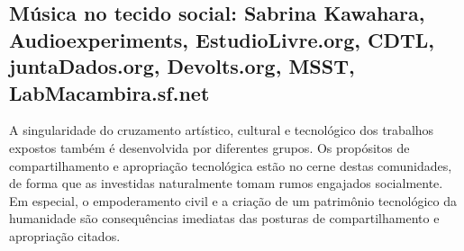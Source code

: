\subsection{Música no tecido social: Sabrina Kawahara, Audioexperiments, EstudioLivre.org, CDTL, juntaDados.org, Devolts.org, MSST, LabMacambira.sf.net}

A singularidade do cruzamento artístico, cultural e tecnológico
dos trabalhos expostos também é desenvolvida por diferentes grupos.
Os propósitos de compartilhamento e apropriação tecnológica estão no
cerne destas comunidades, de forma que as investidas naturalmente tomam
rumos engajados socialmente. Em especial, o empoderamento civil e
a criação de um patrimônio tecnológico da humanidade são consequências
imediatas das posturas de compartilhamento e apropriação citados.

